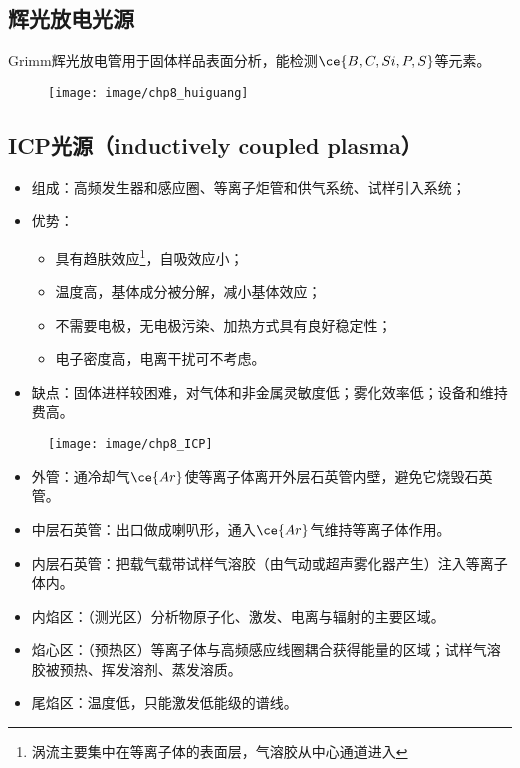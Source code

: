 \subsection{辉光放电光源}
Grimm辉光放电管用于固体样品表面分析，能检测$\ce{B,C,Si,P,S}$等元素。

\begin{figure}[!h]
	\centering
	\texttt{[image: image/chp8\_huiguang]}
	\label{fig:chp8huiguang}
\end{figure}


\subsection{ICP光源（inductively coupled plasma）}
\begin{itemize}
	\item 组成：高频发生器和感应圈、等离子炬管和供气系统、试样引入系统；
	\item 优势：
	\begin{itemize}
		\item 具有趋肤效应\footnote{涡流主要集中在等离子体的表面层，气溶胶从中心通道进入}，自吸效应小；
		\item 温度高，基体成分被分解，减小基体效应；
		\item 不需要电极，无电极污染、加热方式具有良好稳定性；
		\item 电子密度高，电离干扰可不考虑。
	\end{itemize}
	\item 缺点：固体进样较困难，对气体和非金属灵敏度低；雾化效率低；设备和维持费高。
\end{itemize}

\begin{figure}[!h]
	\centering
	\texttt{[image: image/chp8\_ICP]}
	\label{fig:chp8icp}
\end{figure}

\begin{itemize}
	\item 外管：通冷却气$\ce{Ar}$使等离子体离开外层石英管内壁，避免它烧毁石英管。
	\item 中层石英管：出口做成喇叭形，通入$\ce{Ar}$气维持等离子体作用。
	\item 内层石英管：把载气载带试样气溶胶（由气动或超声雾化器产生）注入等离子体内。
	\item 内焰区：（测光区）分析物原子化、激发、电离与辐射的主要区域。
	\item 焰心区：（预热区）等离子体与高频感应线圈耦合获得能量的区域；试样气溶胶被预热、挥发溶剂、蒸发溶质。
	\item 尾焰区：温度低，只能激发低能级的谱线。
\end{itemize}


